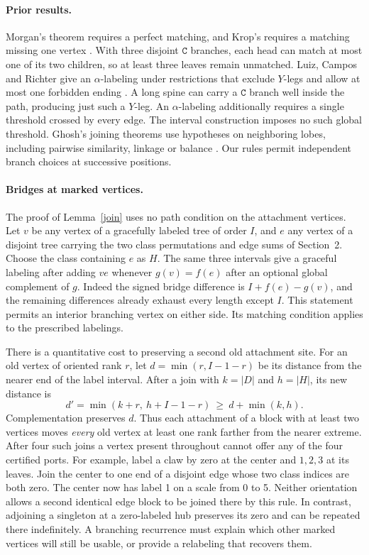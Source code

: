 \documentclass[11pt,a4paper]{article}
\newcommand{\word}[1]{\mathtt{#1}}
\begin{document}
\paragraph{Prior results.} Morgan's theorem requires a perfect matching, and Krop's requires a matching missing one vertex \cite{morgan,krop}. With three disjoint $\word C$ branches, each head can match at most one of its two children, so at least three leaves remain unmatched. Luiz, Campos and Richter give an $\alpha$-labeling under restrictions that exclude $Y$-legs and allow at most one forbidden ending \cite{luiz}. A long spine can carry a $\word C$ branch well inside the path, producing just such a $Y$-leg. An $\alpha$-labeling additionally requires a single threshold crossed by every edge. The interval construction imposes no such global threshold. Ghosh's joining theorems use hypotheses on neighboring lobes, including pairwise similarity, linkage or balance \cite{ghosh}. Our rules permit independent branch choices at successive positions.

\newpage
\paragraph{Bridges at marked vertices.}
The proof of Lemma~\ref{join} uses no path condition on the attachment vertices. Let $v$ be any vertex of a gracefully labeled tree of order $I$, and $e$ any vertex of a disjoint tree carrying the two class permutations and edge sums of Section~2. Choose the class containing $e$ as $H$. The same three intervals give a graceful labeling after adding $ve$ whenever $g(v)=f(e)$ after an optional global complement of $g$. Indeed the signed bridge difference is $I+f(e)-g(v)$, and the remaining differences already exhaust every length except $I$. This statement permits an interior branching vertex on either side. Its matching condition applies to the prescribed labelings.

There is a quantitative cost to preserving a second old attachment site. For an old vertex of oriented rank $r$, let $d=\min(r,I-1-r)$ be its distance from the nearer end of the label interval. After a join with $k=|D|$ and $h=|H|$, its new distance is
\[
 d'=\min(k+r,\ h+I-1-r)\ \ge\ d+\min(k,h).
\]
Complementation preserves $d$. Thus each attachment of a block with at least two vertices moves \emph{every} old vertex at least one rank farther from the nearer extreme. After four such joins a vertex present throughout cannot offer any of the four certified ports. For example, label a claw by zero at the center and $1,2,3$ at its leaves. Join the center to one end of a disjoint edge whose two class indices are both zero. The center now has label 1 on a scale from 0 to 5. Neither orientation allows a second identical edge block to be joined there by this rule. In contrast, adjoining a singleton at a zero-labeled hub preserves its zero and can be repeated there indefinitely. A branching recurrence must explain which other marked vertices will still be usable, or provide a relabeling that recovers them.
\end{document}
